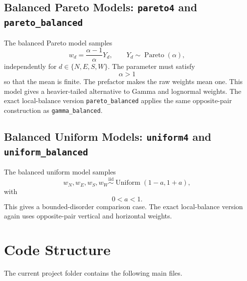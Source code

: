 \documentclass[11pt]{article}
\begin{document}
\subsection{Balanced Pareto Models: \texttt{pareto4} and
\texttt{pareto\_balanced}}

The balanced Pareto model samples
\[
  w_d = \frac{\alpha-1}{\alpha}Y_d,
  \qquad
  Y_d \sim \operatorname{Pareto}(\alpha),
\]
independently for $d\in\{N,E,S,W\}$. The parameter must satisfy
\[
  \alpha>1
\]
so that the mean is finite. The prefactor makes the raw weights mean one.
This model gives a heavier-tailed alternative to Gamma and lognormal weights.
The exact local-balance version \texttt{pareto\_balanced} applies the same
opposite-pair construction as \texttt{gamma\_balanced}.

\subsection{Balanced Uniform Models: \texttt{uniform4} and
\texttt{uniform\_balanced}}

The balanced uniform model samples
\[
  w_N,w_E,w_S,w_W \stackrel{\text{iid}}{\sim} \operatorname{Uniform}(1-a,1+a),
\]
with
\[
  0<a<1.
\]
This gives a bounded-disorder comparison case. The exact local-balance version
 again uses opposite-pair vertical and horizontal
weights.

\section{Code Structure}

The current project folder contains the following main files.
\end{document}
